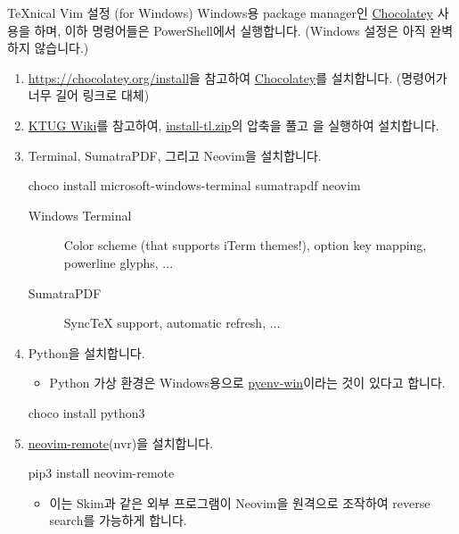 \documentclass{beamer}
\begin{document}
\begin{frame}{\TeX{}nical Vim 설정 (for Windows)}
  Windows용 package manager인 \href{https://chocolatey.org/}{Chocolatey} 사용을
  하며, 이하 명령어들은 PowerShell에서 실행합니다.
  \alert{(Windows 설정은 아직 완벽하지 않습니다.)}
  \begin{enumerate}
    \item \url{https://chocolatey.org/install}을 참고하여
      \href{https://chocolatey.org/}{Chocolatey}를 설치합니다. (명령어가 너무
      길어 링크로 대체)
    \item \href{http://wiki.ktug.org/wiki/wiki.php}{KTUG Wiki}를 참고하여,
      \href{http://mirror.navercorp.com/CTAN/systems/texlive/tlnet/install-tl.zip}{install-tl.zip}의
      압축을 풀고 을 실행하여 설치합니다.
    \item Terminal, SumatraPDF, 그리고 Neovim을 설치합니다.
      \begin{shellcode}
        choco install microsoft-windows-terminal sumatrapdf neovim 
      \end{shellcode}
      \begin{description}
        \item[Windows Terminal] Color scheme (that supports iTerm themes!),
          \alert{option key mapping}, powerline glyphs, ...
        \item[SumatraPDF] Sync\TeX{} support, automatic refresh, ...
      \end{description}

    \framebreak
    \item Python을 설치합니다.
      \begin{itemize}
        \item Python 가상 환경은 Windows용으로
          \href{https://github.com/pyenv-win/pyenv-win}{pyenv-win}이라는 것이
          있다고 합니다.
      \end{itemize}
      \begin{shellcode}
        choco install python3
      \end{shellcode}

    \item \href{https://github.com/mhinz/neovim-remote}{neovim-remote}(nvr)을
      설치합니다.
      \begin{shellcode}
        pip3 install neovim-remote
      \end{shellcode}
      \begin{itemize}
        \item 이는 Skim과 같은 외부 프로그램이 Neovim을 원격으로 조작하여
          reverse search를 가능하게 합니다.
      \end{itemize}


\end{enumerate}
\end{frame}
\end{document}
